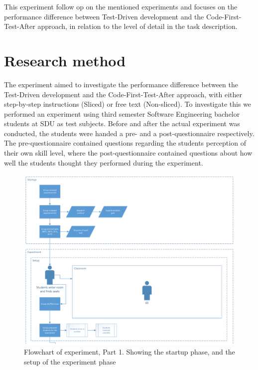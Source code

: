 \documentclass{sig-alternate-05-2015}
\begin{document}
This  experiment follow op on the mentioned experiments and focuses on the performance difference between Test-Driven development and the Code-First-Test-After approach, in relation to the level of detail in the task description.

\vfill
\eject

\section{Research method}
\label{sec:Research method}
The experiment aimed to investigate the performance difference between the Test-Driven development and the Code-First-Test-After approach, with either step-by-step instructions (Sliced) or free text (Non-sliced). To investigate this we performed an experiment using third semester Software Engineering bachelor students at SDU as test subjects.
Before and after the actual experiment was conducted, the students were handed a pre- and a post-questionnaire respectively.
The pre-questionnaire contained questions regarding the students perception of their own skill level, where the post-questionnaire contained questions about how well the students thought they performed during the experiment.

\begin{figure}[!ht]
\hspace*{-3.73in}
	\centering
	\includegraphics[width=2.13\linewidth]{flow01}
	\caption{Flowchart of experiment, Part 1. Showing the startup phase, and the setup of the experiment phase}
	\label{fig:Flowchart1}
\end{figure}
\clearpage
\end{document}
